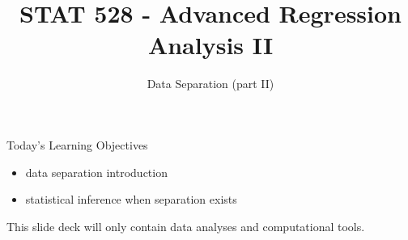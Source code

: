 \documentclass[
  ignorenonframetext,
]{beamer}
\title{STAT 528 - Advanced Regression Analysis II}
\author{Data Separation (part II)}
\date{}
\institute{Daniel J. Eck\\
Department of Statistics\\
University of Illinois}
\providecommand{\tightlist}{%
  \setlength{\itemsep}{0pt}\setlength{\parskip}{0pt}}
\begin{document}
\frame{\titlepage}

\begin{frame}
\newcommand{\R}{\mathbb{R}}
\newcommand{\Prob}{\mathbb{P}}
\newcommand{\Proj}{\textbf{P}}
\newcommand{\Hcal}{\mathcal{H}}
\newcommand{\rootn}{\sqrt{n}}
\newcommand{\p}{\mathbf{p}}
\newcommand{\E}{\text{E}}
\newcommand{\Var}{\text{Var}}
\newcommand{\Cov}{\text{Cov}}
\newcommand{\mubf}{\bm{\mu}}
\newcommand{\logit}{\text{logit}}

\newtheorem{cor}{Corollary}
\newtheorem{lem}{Lemma}
\newtheorem{thm}{Theorem}
\newtheorem{defn}{Definition}
\newtheorem{prop}{Proposition}
\end{frame}

\begin{frame}{Today's Learning Objectives}
\protect\hypertarget{todays-learning-objectives}{}
\begin{itemize}
\tightlist
\item
  data separation introduction
\item
  statistical inference when separation exists
\end{itemize}

\vspace{12pt}

This slide deck will only contain data analyses and computational tools.
\end{frame}
\end{document}
